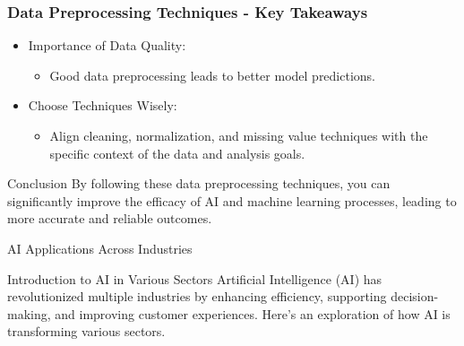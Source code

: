 \documentclass[aspectratio=169]{beamer}
\begin{document}
\begin{frame}[fragile]
    \frametitle{Data Preprocessing Techniques - Key Takeaways}
    \begin{itemize}
        \item Importance of Data Quality:
            \begin{itemize}
                \item Good data preprocessing leads to better model predictions.
            \end{itemize}
        \item Choose Techniques Wisely:
            \begin{itemize}
                \item Align cleaning, normalization, and missing value techniques with the specific context of the data and analysis goals.
            \end{itemize}
    \end{itemize}
    \begin{block}{Conclusion}
        By following these data preprocessing techniques, 
        you can significantly improve the efficacy of AI and machine learning processes, 
        leading to more accurate and reliable outcomes.
    \end{block}
\end{frame}

\begin{frame}[fragile]{AI Applications Across Industries}
    \begin{block}{Introduction to AI in Various Sectors}
        Artificial Intelligence (AI) has revolutionized multiple industries by enhancing efficiency, supporting decision-making, and improving customer experiences. Here’s an exploration of how AI is transforming various sectors.
    \end{block}
\end{frame}
\end{document}
